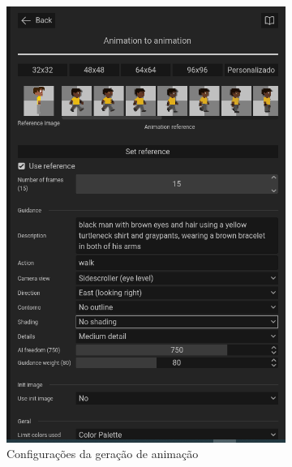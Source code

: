 \begin{figure}[htbp]
    \centering
    \caption{\small Processo da utilização 2 da ferramenta de animação do PixelLab em julho/2025}
    \label{fig:pixelLabAnimacao2}

    \begin{subfigure}{0.6\linewidth}
        \includegraphics[width=1\linewidth]{figs/pixelLab/dia3/tela_3.PNG}
        \caption{\small Configurações da geração de animação}
        \label{fig:pixelLabAnimacao2a}
    \end{subfigure}
    \begin{subfigure}{0.35\linewidth}

\end{subfigure}
\end{figure}
